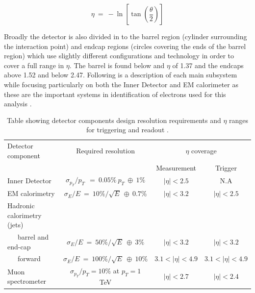 	\begin{equation}
		\eta~=~-\ln[\tan(\frac{\theta}{2})]
		\label{eq:eta}
	\end{equation}

	Broadly the detector is also divided in to the barrel region (cylinder surrounding the interaction point) and endcap regions (circles covering the ends of the barrel region) which use slightly different configurations and technology in order to cover a full range in $\eta$. The barrel is found below and $\eta$ of 1.37 and the endcaps above 1.52 and below 2.47. Following is a description of each main subsystem while focusing particularly on both the Inner Detector and EM calorimeter as these are the important systems in identification of electrons used for this analysis \cite{Aad:1129811}.


	\begin {table}[h]
	\begin{center}
	\begin{tabular}{ | l | c | c | c | } 
		\hline
		Detector component & Required resolution & \multicolumn{2}{c|}{$\eta$ coverage} \\
		 & & Measurement & Trigger \\
    	\hline\hline
    	Inner Detector & $\sigma_{p_{T}}/p_{T}~~=~0.05\%~p_{T}~\oplus~1\%$ & $|\eta|<2.5$ & N.A \\
    	\hline
    	EM calorimetry & $\sigma_{E}/E~=~10\%/\sqrt{E}~\oplus~0.7\%$ & $|\eta|<3.2$ & $|\eta|<2.5$ \\
    	\hline
    	Hadronic calorimetry (jets) &  &  &  \\
    	~~~barrel and end-cap & $\sigma_{E}/E~=~50\%/\sqrt{E}~\oplus~3\%$ & $|\eta|<3.2$ & $|\eta|<3.2$ \\
    	~~~forward  & $\sigma_{E}/E~=~100\%/\sqrt{E}~\oplus~10\%$ & $3.1<|\eta|<4.9$ & $3.1<|\eta|<4.9$ \\
    	\hline
    	Muon spectrometer & $\sigma_{p_{T}}/p_{T} =10\%$ at $p_{T} = 1$ TeV & $|\eta|<2.7$ & $|\eta|<2.4$ \\
    	\hline
  	\end{tabular}
  	\label{tab:det_res}
  	\caption{Table showing detector components design resolution requirements and $\eta$ ranges for triggering and readout \cite{Aad:1129811}.}
  	\end{center}
	\end {table}




